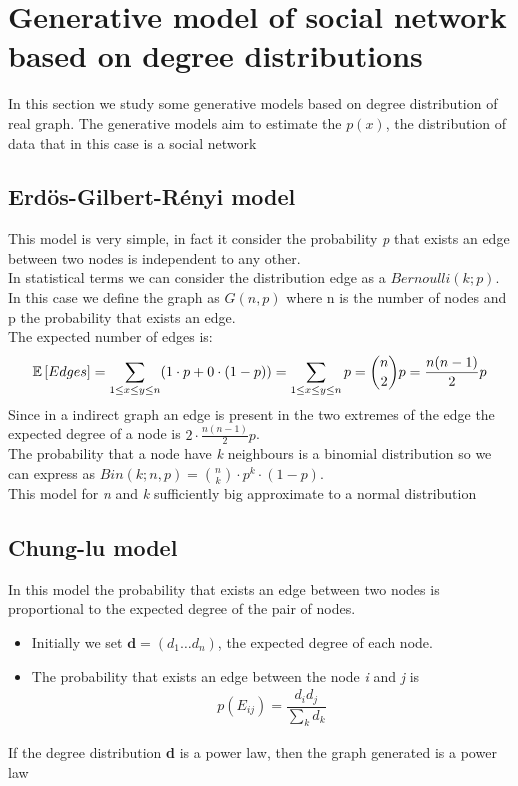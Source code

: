 \section{Generative model of social network based on degree distributions}
In this section we study some generative models based on degree distribution of real graph. The generative models aim to estimate the $ p(x) $, the distribution of data that in this case is a social network
\subsection{Erd\"{o}s-Gilbert-R\'{e}nyi model}
This model is very simple, in fact it consider the probability \textit{p} that exists an edge between two nodes is independent to any other. \\ In statistical terms we can consider the distribution edge as a $ Bernoulli(k;p) $.\\ In this case we define the graph as $ G(n,p) $ where n is the number of nodes and p the probability that exists an edge.\\
The expected number of edges is:
\begin{align*}
\operatorname{\mathbb{E}} \left[ Edges \right]= \sum_{1\leq x \leq y \leq n} (1\cdot p + 0 \cdot (1-p)) = \sum_{1\leq x \leq y \leq n} p = \binom{n}{2} p = \dfrac{n(n-1)}{2} p
\end{align*}
Since in a indirect graph an edge is present in the two extremes of the edge the expected degree of a node is $ 2 \cdot   \frac{n(n-1)}{2} p $.\\
The probability that a node have \textit{k} neighbours is a binomial distribution  so we can express as $ Bin(k; n, p) = \binom{n}{k} \cdot p^k \cdot (1-p) $. %
\\
This model for \textit{n} and \textit{k} sufficiently big approximate to a normal distribution
\subsection{Chung-lu model}
In this model the probability that exists an edge between two nodes is proportional to the expected degree of the pair of nodes.
\begin{itemize}
	\item Initially we set $ \textbf{d} = (d_1 \ldots d_n) $, the expected degree of each node.
	\item The probability that exists an edge between the node \textit{i} and \textit{j} is \begin{align*}  p(E_{ij}) = \dfrac{d_i d_j}{\sum_k d_k} 	\end{align*} 
\end{itemize}
If the degree distribution \textbf{d} is a power law, then the graph generated is a power law
